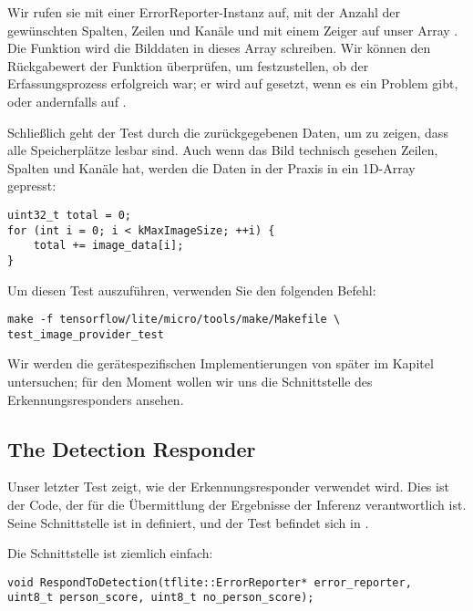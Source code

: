 Wir rufen sie mit einer ErrorReporter-Instanz auf, mit der Anzahl der gewünschten Spalten, Zeilen und Kanäle und mit einem Zeiger auf unser Array . Die Funktion wird die Bilddaten in dieses Array schreiben. Wir können den Rückgabewert der Funktion überprüfen, um festzustellen, ob der Erfassungsprozess erfolgreich war; er wird auf  gesetzt, wenn es ein Problem gibt, oder andernfalls auf .

Schließlich geht der Test durch die zurückgegebenen Daten, um zu zeigen, dass alle Speicherplätze lesbar sind. Auch wenn das Bild technisch gesehen Zeilen, Spalten und Kanäle hat, werden die Daten in der Praxis in ein 1D-Array gepresst:

\begin{code}
    \begin{lstlisting}
uint32_t total = 0;
for (int i = 0; i < kMaxImageSize; ++i) {
    total += image_data[i];
}
  \end{lstlisting}
\end{code}

Um diesen Test auszuführen, verwenden Sie den folgenden Befehl:

\begin{code}
    \begin{lstlisting}
make -f tensorflow/lite/micro/tools/make/Makefile \
test_image_provider_test
  \end{lstlisting}
\end{code}

Wir werden die gerätespezifischen Implementierungen von  später im Kapitel untersuchen; für den Moment wollen wir uns die Schnittstelle des Erkennungsresponders ansehen.

\subsection{The Detection Responder}

Unser letzter Test zeigt, wie der Erkennungsresponder verwendet wird. Dies ist der Code, der für die Übermittlung der Ergebnisse der Inferenz verantwortlich ist. Seine Schnittstelle ist in  definiert, und der Test befindet sich in .

Die Schnittstelle ist ziemlich einfach:

\begin{code}
    \begin{lstlisting}
void RespondToDetection(tflite::ErrorReporter* error_reporter,
uint8_t person_score, uint8_t no_person_score);
  \end{lstlisting}
\end{code}

